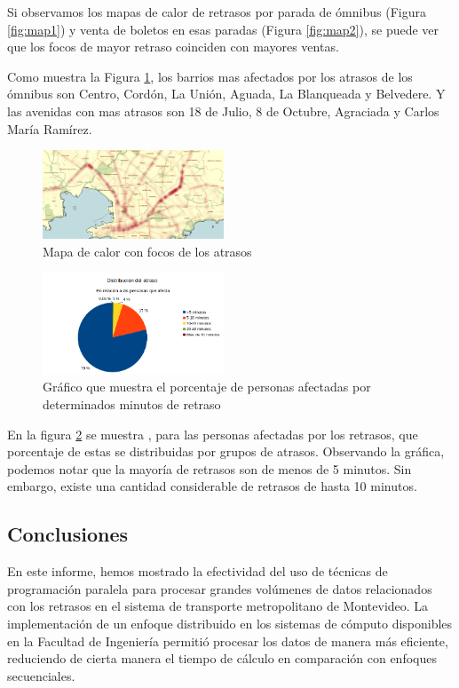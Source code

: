 \documentclass[journal]{IEEEtran}
\begin{document}
Si observamos los mapas de calor de retrasos por parada de ómnibus (Figura \ref{fig:map1}) y venta de boletos en esas paradas (Figura \ref{fig:map2}), se puede ver que los focos de mayor retraso coinciden con mayores ventas.
\newline

Como muestra la Figura \ref{fig:map6}, los barrios mas afectados por los atrasos de los ómnibus son Centro, Cordón, La Unión, Aguada, La Blanqueada y Belvedere.
\newline
Y las avenidas con mas atrasos son 18 de Julio, 8 de Octubre, Agraciada y Carlos María Ramírez.
\newline

\begin{figure}[h]
    \centering
    \includegraphics[width=0.48\textwidth]{Focos_fuertes}
    \caption{Mapa de calor con focos de los atrasos}
    \label{fig:map6}
\end{figure}

\begin{figure}[h]
    \centering
    \includegraphics[width=0.48\textwidth]{graficoAtrasosCategorizado}
    \caption{Gráfico que muestra el porcentaje de personas afectadas por determinados minutos de retraso}
    \label{fig:atrasos}
\end{figure}

En la figura \ref{fig:atrasos} se muestra , para las personas afectadas por los retrasos, que porcentaje  de estas se distribuidas por grupos de atrasos. Observando la gráfica, podemos notar que la mayoría de retrasos son de menos de 5 minutos. Sin embargo, existe una cantidad considerable de retrasos de hasta 10 minutos.

\subsection{Conclusiones}
En este informe, hemos mostrado la efectividad del uso de técnicas de programación paralela para procesar grandes volúmenes de datos relacionados con los retrasos en el sistema de transporte metropolitano de Montevideo. La implementación de un enfoque distribuido en los sistemas de cómputo disponibles en la Facultad de Ingeniería permitió procesar los datos de manera más eficiente, reduciendo de cierta manera el tiempo de cálculo en comparación con enfoques secuenciales.
\end{document}
